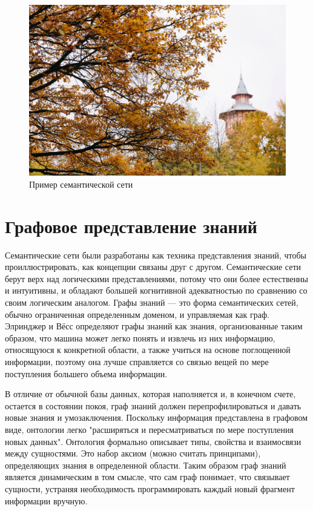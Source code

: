 \begin{figure}[ht!]
    \center
    \includegraphics [scale=0.27] {my_folder/images//spbpu_hydrotower}
    \caption{Пример семантической сети}
    \label{fig:spbpu_hydrotower}
\end{figure}


\section{Графовое представление знаний}

Семантические сети были разработаны как техника представления знаний, чтобы проиллюстрировать, как концепции связаны друг с другом. Семантические сети берут верх над логическими представлениями, потому что они более естественны и интуитивны, и обладают большей когнитивной адекватностью по сравнению со своим логическим аналогом. Графы знаний — это форма семантических сетей, обычно ограниченная определенным доменом, и управляемая как граф. Элринджер и Вёсс определяют графы знаний как знания, организованные таким образом, что машина может легко понять и извлечь из них информацию, относящуюся к конкретной области, а также учиться на основе поглощенной информации, поэтому она лучше справляется со связью вещей по мере поступления большего объема информации.

В отличие от обычной базы данных, которая наполняется и, в конечном счете, остается в состоянии покоя, граф знаний должен перепрофилироваться и давать новые знания и умозаключения. Поскольку информация представлена в графовом виде, онтологии легко "расширяться и пересматриваться по мере поступления новых данных". Онтология формально описывает типы, свойства и взаимосвязи между сущностями. Это набор аксиом (можно считать принципами), определяющих знания в определенной области. Таким образом граф знаний является динамическим в том смысле, что сам граф понимает, что связывает сущности, устраняя необходимость программировать каждый новый фрагмент информации вручную.


